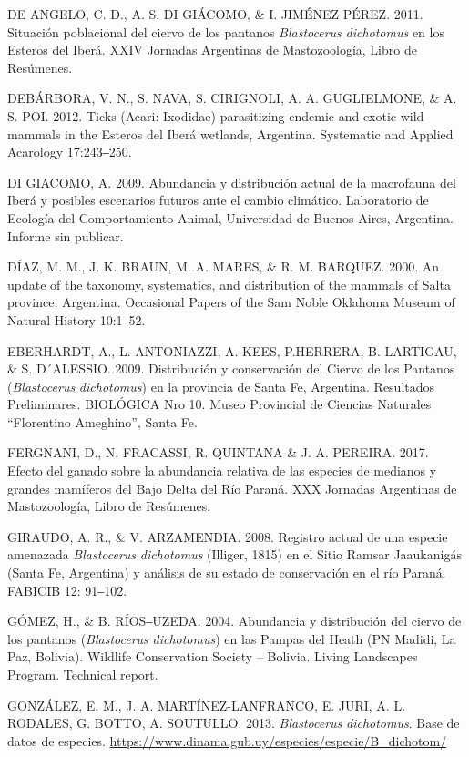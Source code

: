 \documentclass[
  x11names]{article}
\begin{document}
DE ANGELO, C. D., A. S. DI GIÁCOMO, \& I. JIMÉNEZ PÉREZ. 2011. Situación
poblacional del ciervo de los pantanos \textit{Blastocerus}
\textit{dichotomus} en los Esteros del Iberá. XXIV Jornadas Argentinas
de Mastozoología, Libro de Resúmenes.

DEBÁRBORA, V. N., S. NAVA, S. CIRIGNOLI, A. A. GUGLIELMONE, \& A. S.
POI. 2012. Ticks (Acari: Ixodidae) parasitizing endemic and exotic wild
mammals in the Esteros del Iberá wetlands, Argentina. Systematic and
Applied Acarology 17:243‒250.

DI GIACOMO, A. 2009. Abundancia y distribución actual de la macrofauna
del Iberá y posibles escenarios futuros ante el cambio climático.
Laboratorio de Ecología del Comportamiento Animal, Universidad de Buenos
Aires, Argentina. Informe sin publicar.

DÍAZ, M. M., J. K. BRAUN, M. A. MARES, \& R. M. BARQUEZ. 2000. An update
of the taxonomy, systematics, and distribution of the mammals of Salta
province, Argentina. Occasional Papers of the Sam Noble Oklahoma Museum
of Natural History 10:1‒52.

EBERHARDT, A., L. ANTONIAZZI, A. KEES, P.HERRERA, B. LARTIGAU, \& S.
D´ALESSIO. 2009. Distribución y conservación del Ciervo de los Pantanos
(\textit{Blastocerus} \textit{dichotomus}) en la provincia de Santa Fe,
Argentina. Resultados Preliminares. BIOLÓGICA Nro 10. Museo Provincial
de Ciencias Naturales ``Florentino Ameghino'', Santa Fe.

FERGNANI, D., N. FRACASSI, R. QUINTANA \& J. A. PEREIRA. 2017. Efecto
del ganado sobre la abundancia relativa de las especies de medianos y
grandes mamíferos del Bajo Delta del Río Paraná. XXX Jornadas Argentinas
de Mastozoología, Libro de Resúmenes.

GIRAUDO, A. R., \& V. ARZAMENDIA. 2008. Registro actual de una especie
amenazada \textit{Blastocerus} \textit{dichotomus} (Illiger, 1815) en el
Sitio Ramsar Jaaukanigás (Santa Fe, Argentina) y análisis de su estado
de conservación en el río Paraná. FABICIB 12: 91‒102.

GÓMEZ, H., \& B. RÍOS‒UZEDA. 2004. Abundancia y distribución del ciervo
de los pantanos (\textit{Blastocerus} \textit{dichotomus}) en las Pampas
del Heath (PN Madidi, La Paz, Bolivia). Wildlife Conservation Society --
Bolivia. Living Landscapes Program. Technical report.

GONZÁLEZ, E. M., J. A. MARTÍNEZ-LANFRANCO, E. JURI, A. L. RODALES, G.
BOTTO, A. SOUTULLO. 2013. \textit{Blastocerus} \textit{dichotomus}. Base
de datos de especies.
\url{https://www.dinama.gub.uy/especies/especie/B_dichotom/}
\end{document}
